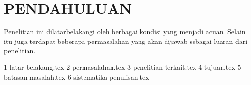 \chapter{PENDAHULUAN}
\label{chap:pendahuluan}

Penelitian ini dilatarbelakangi oleh berbagai kondisi yang menjadi acuan.
Selain itu juga terdapat beberapa permasalahan yang akan dijawab sebagai luaran dari penelitian.

{1-latar-belakang.tex}
{2-permasalahan.tex}
{3-penelitian-terkait.tex}
{4-tujuan.tex}
{5-batasan-masalah.tex}
{6-sistematika-penulisan.tex}
